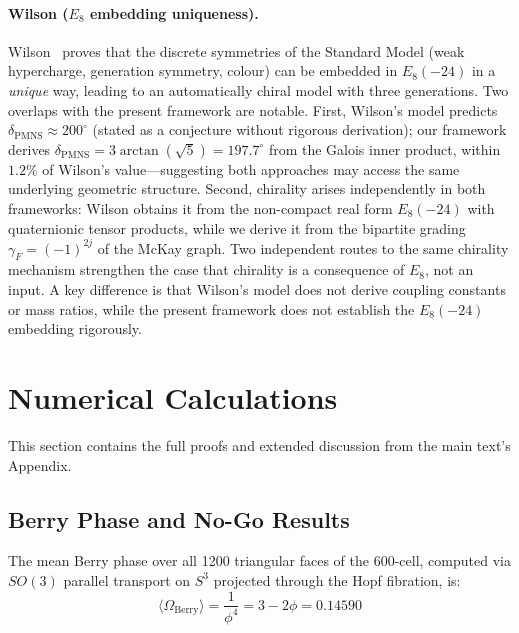 \documentclass[12pt,a4paper]{article}
\theoremstyle{definition}
\begin{document}
\paragraph{Wilson ($E_8$ embedding uniqueness).}
Wilson~\cite{wilson2024} proves that the discrete symmetries of the Standard Model (weak hypercharge, generation symmetry, colour) can be embedded in $E_8(-24)$ in a \emph{unique} way, leading to an automatically chiral model with three generations.  Two overlaps with the present framework are notable.  First, Wilson's model predicts $\delta_{\mathrm{PMNS}} \approx 200^\circ$ (stated as a conjecture without rigorous derivation); our framework derives $\delta_{\mathrm{PMNS}} = 3\arctan(\sqrt{5}) = 197.7^\circ$ from the Galois inner product, within $1.2\%$ of Wilson's value---suggesting both approaches may access the same underlying geometric structure.  Second, chirality arises independently in both frameworks: Wilson obtains it from the non-compact real form $E_8(-24)$ with quaternionic tensor products, while we derive it from the bipartite grading $\gamma_F = (-1)^{2j}$ of the McKay graph.  Two independent routes to the same chirality mechanism strengthen the case that chirality is a consequence of $E_8$, not an input.  A key difference is that Wilson's model does not derive coupling constants or mass ratios, while the present framework does not establish the $E_8(-24)$ embedding rigorously.


\section{Numerical Calculations}
\label{sec:S-numerics}

This section contains the full proofs and extended discussion from the main text's Appendix.

\subsection{Berry Phase and No-Go Results}

The mean Berry phase over all 1200 triangular faces of the 600-cell, computed via $SO(3)$ parallel transport on $S^3$ projected through the Hopf fibration, is:
\begin{equation}
\langle \Omega_{\text{Berry}} \rangle = \frac{1}{\phi^4} = 3 - 2\phi = 0.14590
\end{equation}
\end{document}
